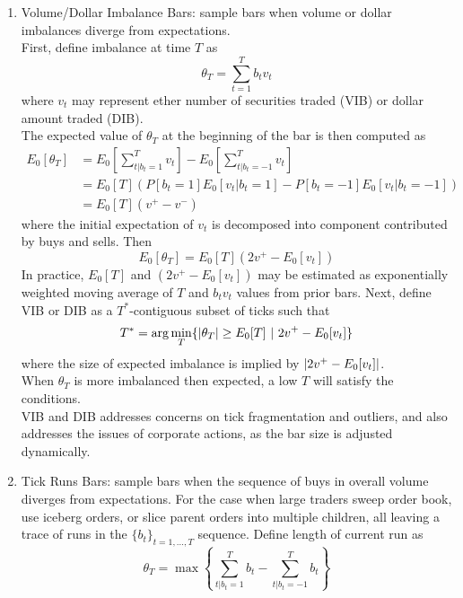 \begin{remark}
\begin{enumerate}[label=\roman*.]
\item Volume/Dollar Imbalance Bars: sample bars when volume or dollar imbalances diverge from expectations.\\
First, define imbalance at time $T$ as
\begin{equation}
\theta_T = \sum\limits_{t=1}^T b_t v_t \nonumber
\end{equation}
where $v_t$ may represent ether number of securities traded (VIB) or dollar amount traded (DIB).\\
The expected value of $\theta_T$ at the beginning of the bar is then computed as
\begin{align}
E_0[\theta_T] &= E_0 \left[ \sum\limits_{t \vert b_t = 1}^T v_t \right] - E_0 \left[ \sum\limits_{t \vert b_t = -1}^T v_t \right] \nonumber \\
&= E_0[T] (P[b_t = 1]E_0[v_t \vert b_t = 1] - P[b_t = -1]E_0[v_t \vert b_t = -1]) \nonumber \\
&= E_0[T] (v^+ - v^-) \nonumber
\end{align}
where the initial expectation of $v_t$ is decomposed into component contributed by buys and sells. Then
\begin{equation}
E_0[\theta_T] = E_0[T] (2v^+ - E_0 [v_t]) \nonumber
\end{equation}
In practice, $E_0[T]$ and $(2v^+ - E_0 [v_t])$ may be estimated as exponentially weighted moving average of $T$ and $b_t v_t$ values from prior bars. Next, define VIB or DIB as a $T^*$-contiguous subset of ticks such that
\begin{equation}
T^* = \arg \min_T \{ \left\lvert\theta_T\right\rvert \geq E_0[T] \ \vert \ 2v^+ - E_0[v_t] \} \nonumber
\end{equation}
where the size of expected imbalance is implied by $\left\lvert2v^+ - E_0[v_t]\right\rvert$.\\
When $\theta_T$ is more imbalanced then expected, a low $T$ will satisfy the conditions.\\
VIB and DIB addresses concerns on tick fragmentation and outliers, and also addresses the issues of corporate actions, as the bar size is adjusted dynamically.
\item Tick Runs Bars: sample bars when the sequence of buys in overall volume diverges from expectations. For the case when large traders sweep order book, use iceberg orders, or slice parent orders into multiple children, all leaving a trace of runs in the $\{b_t\}_{t = 1, \ldots, T}$ sequence. Define length of current run as
\begin{equation}
\theta_T = \max \left\{ \sum\limits_{t \vert b_t = 1}^T b_t - \sum\limits_{t \vert b_t = -1}^T b_t  \right\} \nonumber

\end{equation}
\end{enumerate}
\end{remark}
